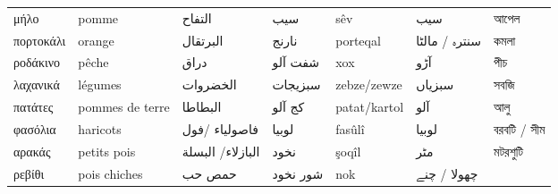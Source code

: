 \begin{longtable}{p{3.5cm} p{3.5cm} p{3.5cm} p{3.5cm} p{3.5cm} p{3.5cm} p{3.5cm} }
 μήλο                                       & pomme                                                            & التفاح                           & سیب                 & sêv                        & سیب                                                   & আপেল                                        \\
 πορτοκάλι                                  & orange                                                           & البرتقال                         & نارنج               & porteqal                   & سنترہ / مالٹا                                         & কমলা                                        \\
 ροδάκινο                                   & pêche                                                            & دراق                             & شفت آلو             & xox                        & آڑو                                                  & পীচ                                         \\
 λαχανικά                                   & légumes                                                          & الخضروات                         & سبزیجات             & zebze/zewze                & سبزیاں                                                & সবজি                                        \\
 πατάτες                                    & pommes de terre                                                  & البطاطا                          & کج آلو              & patat/kartol               & آلو                                                  & আলু                                         \\
 φασόλια                                    & haricots                                                         & فاصولياء /فول                    & لوبیا               & fasûlî                     & لوبیا                                                 & বরবটি / সীম                                 \\
 αρακάς                                     & petits pois                                                      & البازلاء/ البسلة                 & نخود                & şoqîl                      & مٹر                                                   & মটরশুটি                                     \\
 ρεβίθι                                     & pois chiches                                                     & حمص حب                           & شور نخود            & nok                        & چھولا / چنے                                           &                                             \\

\end{longtable}

